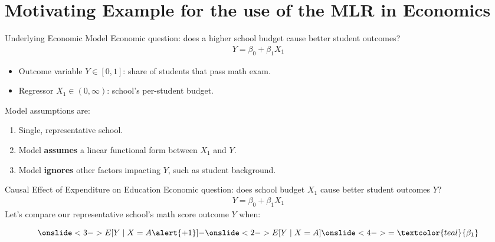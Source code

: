 \documentclass[11pt, aspectratio = 169]{beamer}
\begin{document}
\section{Motivating Example for the use of the MLR in Economics}

\begin{frame}{Underlying Economic Model}
Economic question: does a higher school budget \alert{cause} better student outcomes?
\pause
\begin{align*}
    Y = \beta_0 + \beta_1 X_1
\end{align*}

\begin{itemize}
    \item Outcome variable $Y \in [0,1]$: share of students that pass math exam.\footnotemark[1]
    \item Regressor $X_1 \in (0,\infty)$: school's per-student budget.\footnotemark[2]
\end{itemize}
\pause 

Model assumptions are:
\begin{enumerate}
    \item Single, representative school.
    \item Model \textbf{assumes} a linear functional form between $X_1$ and $Y$.
    \item Model \textbf{ignores} other factors impacting $Y$, such as student background.
\end{enumerate}
\vspace{1cm}
\end{frame}

\begin{frame}{Causal Effect of Expenditure on Education}
    Economic question: does school budget $X_1$ \alert{cause} better student outcomes $Y$?
    \begin{align*}
        Y = \beta_0 + \beta_1 X_1
    \end{align*}
    Let's compare our representative school's math score outcome $Y$ when:
    \begin{itemize}
    \end{itemize}
    \[
    \onslide<3->{E[Y \mid X = A \alert{+1}] - }%
    \onslide<2->{E[Y \mid X = A]}%
    \onslide<4->{ = \textcolor{teal}{\beta_1}}
    \]
    \vspace{-0.5cm}
\end{frame}
\end{document}
